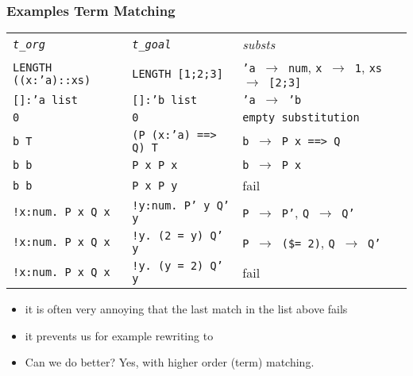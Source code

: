\begin{frame}
\frametitle{Examples Term Matching}

{\scriptsize
\begin{tabular}{lll}
\emph{\texttt{t\_org}} & \emph{\texttt{t\_goal}} & \emph{substs}\\
\texttt{LENGTH ((x:'a)::xs)} & \texttt{LENGTH [1;2;3]} & 
  \texttt{'a $\to$ num}, 
  \texttt{x $\to$ 1}, 
  \texttt{xs $\to$ [2;3]} \\
\texttt{[]:'a list} & \texttt{[]:'b list} & 
  \texttt{'a $\to$ 'b} \\
\texttt{0} & \texttt{0} & 
  \texttt{empty substitution} \\
\texttt{b \holAnd{} T} & \texttt{(P (x:'a) ==> Q) \holAnd{} T} & 
  \texttt{b $\to$ P x ==> Q} \\
\texttt{b \holAnd{} b} & \texttt{P x \holAnd{} P x} & 
  \texttt{b $\to$ P x} \\
\texttt{b \holAnd{} b} & \texttt{P x \holAnd{} P y} & 
  fail \\
\texttt{!x:num.\ P x \holAnd{} Q x} & \texttt{!y:num.\ P' y \holAnd{} Q' y} &
  \texttt{P $\to$ P'}, 
  \texttt{Q $\to$ Q'} \\  
\texttt{!x:num.\ P x \holAnd{} Q x} & \texttt{!y.\ (2 = y) \holAnd{} Q' y} &
  \texttt{P $\to$ (\$= 2)}, 
  \texttt{Q $\to$ Q'} \\  
\texttt{!x:num.\ P x \holAnd{} Q x} & \texttt{!y.\ (y = 2) \holAnd{} Q' y} &
 fail
\end{tabular}
}
\bigskip

\begin{itemize}
\item it is often very annoying that the last match in the list above fails
\item it prevents us for example rewriting  to\\
 \item Can we do better? Yes, with higher order (term) matching.
\end{itemize}

\end{frame}


